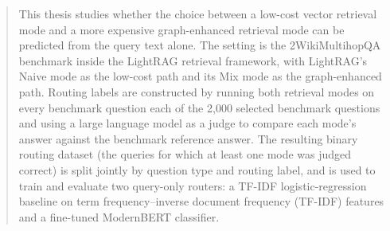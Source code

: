 \documentclass[english, bibtex]{kththesis}               %
\numberwithin{listing}{chapter}
\providecommand{\DIFaddtex}[1]{{\protect\color{blue} \sf #1}} %
\providecommand{\DIFdeltex}[1]{{\protect\color{red} \scriptsize #1}} %
\providecommand{\DIFaddbegin}{} %
\providecommand{\DIFaddend}{} %
\providecommand{\DIFdelbegin}{} %
\providecommand{\DIFdelend}{} %
\providecommand{\DIFadd}[1]{\texorpdfstring{\DIFaddtex{#1}}{#1}} %
\providecommand{\DIFdel}[1]{\texorpdfstring{\DIFdeltex{#1}}{}} %
\begin{document}
\begin{abstract}
\begin{scontents}[store-env=abstracts,print-env=true]
This thesis studies whether the choice between a low-cost vector retrieval mode and a more expensive graph-enhanced retrieval mode can be predicted from the query text alone. The setting is the 2WikiMultihopQA benchmark inside the LightRAG retrieval framework, with LightRAG's Naive mode as the low-cost path and its Mix mode as the graph-enhanced path. Routing labels are constructed by running both retrieval modes on \DIFdelbegin \DIFdel{every benchmark question }\DIFdelend \DIFaddbegin \DIFadd{each of the 2,000 selected benchmark questions }\DIFaddend and using a large language model as a judge to compare each mode's answer against the benchmark reference answer. The resulting binary routing dataset \DIFaddbegin \DIFadd{(the queries for which at least one mode was judged correct) }\DIFaddend is split jointly by question type and routing label, and is used to train and evaluate two query-only routers: a \DIFdelbegin \DIFdel{TF-IDF }\DIFdelend logistic-regression baseline \DIFaddbegin \DIFadd{on term frequency--inverse document frequency (TF-IDF) features }\DIFaddend and a fine-tuned ModernBERT classifier.


\end{scontents}
\end{abstract}
\end{document}
